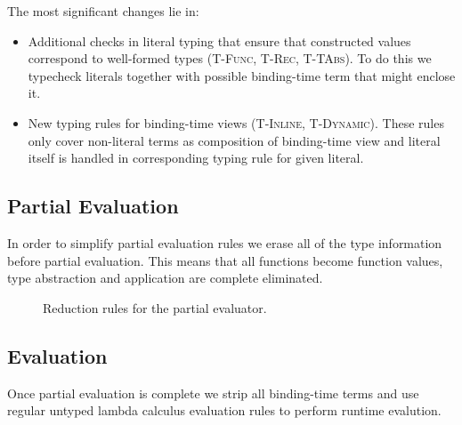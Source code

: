 The most significant changes lie in:
\begin{itemize}
  \item Additional checks in literal typing that ensure that constructed
        values correspond to well-formed types (\textsc{T-Func, T-Rec, T-TAbs}).
        To do this we typecheck literals together with possible binding-time term
        that might enclose it.
  \item New typing rules for binding-time views (\textsc{T-Inline, T-Dynamic}).
        These rules only cover non-literal terms as composition of binding-time view
        and literal itself is handled in corresponding typing rule for given literal.
\end{itemize}

\subsection{Partial Evaluation}

In order to simplify partial evaluation rules we erase all of the type information before partial evaluation.
This means that all functions become function values, type abstraction and application are complete eliminated.

\begin{figure}
\begin{multicols}{2}[]

    {}

    {}

    {}

    {}

    {}

    {}
\end{multicols}
\vspace{4pt}

    {}

    {}
    {}

\caption{Reduction rules for the partial evaluator.}
\label{fig:partial-evaluation}
\end{figure}

\subsection{Evaluation}
Once partial evaluation is complete we strip all binding-time terms and use regular untyped
lambda calculus evaluation rules to perform runtime evalution.

\clearpage
